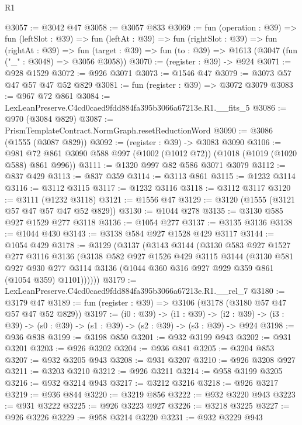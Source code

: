 \begin{lexlean}{R1}
\begin{coremodule}
@3057 := @3042 @47
@3058 := @3057 @833
@3069 := fun (operation : @39) =>
  fun (leftSlot : @39) =>
  fun (leftAt : @39) =>
  fun (rightSlot : @39) =>
  fun (rightAt : @39) =>
  fun (target : @39) => fun (to : @39) => @1613 (@3047 (fun ("_" : @3048) => @3056 @3058))
@3070 := (register : @39) -> @924
@3071 := @928 @1529
@3072 := @926 @3071
@3073 := @1546 @47
@3079 := @3073 @57 @47 @57 @47 @52 @829
@3081 := fun (register : @39) => @3072 @3079
@3083 := @967 @72 @861
@3084 := LexLeanPreserve.C4cd0caed9fdd884fa395b3066a67213e.R1.__fits_5
@3086 := @970 (@3084 @829)
@3087 := PrismTemplateContract.NormGraph.resetReductionWord
@3090 := @3086 (@1555 (@3087 @829))
@3092 := (register : @39) -> @3083 @3090
@3106 := @981 @72 @861 @3090 @588 @997 (@1002 (@1012 @72)) (@1018 (@1019 (@1020 @588) @861 @996))
@3111 := @1320 @997 @82 @586 @3071 @3079
@3112 := @837 @429
@3113 := @837 @359
@3114 := @3113 @861
@3115 := @1232 @3114
@3116 := @3112 @3115
@3117 := @1232 @3116
@3118 := @3112 @3117
@3120 := @3111 (@1232 @3118)
@3121 := @1556 @47
@3129 := @3120 (@1555 (@3121 @57 @47 @57 @47 @52 @829))
@3130 := @1044 @278
@3135 := @3130 @585 @927 @1529 @277 @3118
@3136 := @1054 @277
@3137 := @3135 @3136
@3138 := @1044 @430
@3143 := @3138 @584 @927 @1528 @429 @3117
@3144 := @1054 @429
@3178 := @3129
    (@3137
      (@3143
        @3144
        (@3130
          @583
          @927
          @1527
          @277
          @3116
          @3136
          (@3138
            @582
            @927
            @1526
            @429
            @3115
            @3144
            (@3130
              @581
              @927
              @930
              @277
              @3114
              @3136
              (@1044 @360 @316 @927 @929 @359 @861 (@1054 @359) @1101))))))
@3179 := LexLeanPreserve.C4cd0caed9fdd884fa395b3066a67213e.R1.__rel_7
@3180 := @3179 @47
@3189 := fun (register : @39) => @3106 (@3178 (@3180 @57 @47 @57 @47 @52 @829))
@3197 := (i0 : @39) ->
  (i1 : @39) ->
  (i2 : @39) -> (i3 : @39) -> (s0 : @39) -> (s1 : @39) -> (s2 : @39) -> (s3 : @39) -> @924
@3198 := @936 @838
@3199 := @3198 @850
@3201 := @932 @3199 @943
@3202 := @931 @3201
@3203 := @926 @3202
@3204 := @936 @841
@3205 := @3204 @853
@3207 := @932 @3205 @943
@3208 := @931 @3207
@3210 := @926 @3208 @927
@3211 := @3203 @3210
@3212 := @926 @3211
@3214 := @958 @3199 @3205
@3216 := @932 @3214 @943
@3217 := @3212 @3216
@3218 := @926 @3217
@3219 := @936 @844
@3220 := @3219 @856
@3222 := @932 @3220 @943
@3223 := @931 @3222
@3225 := @926 @3223 @927
@3226 := @3218 @3225
@3227 := @926 @3226
@3229 := @958 @3214 @3220
@3231 := @932 @3229 @943

\end{coremodule}
\end{lexlean}

